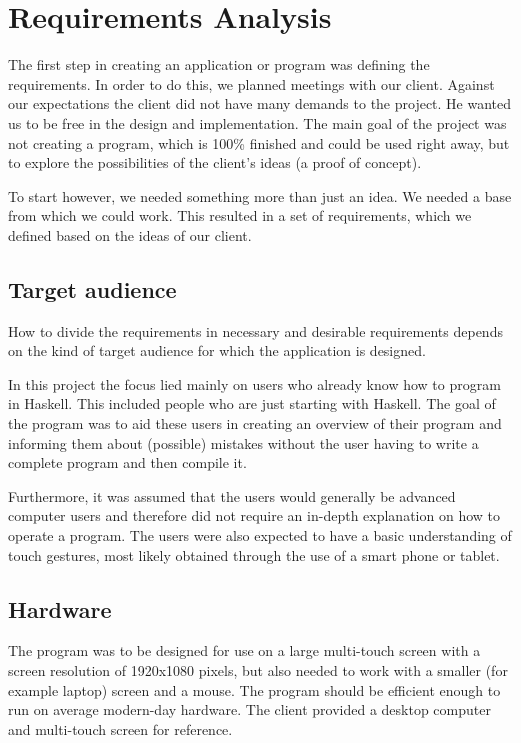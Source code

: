 \chapter{Requirements Analysis}

The first step in creating an application or program was defining the requirements. In order to do this, we planned meetings with our client. Against our expectations the client did not have many demands to the project. He wanted us to be free in the design and implementation. The main goal of the project was not creating a program, which is 100\% finished and could be used right away, but to explore the possibilities of the client's ideas (a proof of concept).

To start however, we needed something more than just an idea. We needed a base from which we could work. This resulted in a set of requirements, which we defined based on the ideas of our client.

\section{Target audience}

How to divide the requirements in necessary and desirable requirements depends on the kind of target audience for which the application is designed.  

In this project the focus lied mainly on users who already know how to program in Haskell. This included people who are just starting with Haskell.
The goal of the program was to aid these users in creating an overview of their program and informing them about (possible) mistakes without the user having to write a complete program and then compile it.

Furthermore, it was assumed that the users would generally be advanced computer users and therefore did not require an in-depth explanation on how to operate a program. The users were also expected to have a basic understanding of touch gestures, most likely obtained through the use of a smart phone or tablet.

\section{Hardware}

The program was to be designed for use on a large multi-touch screen with a screen resolution of 1920x1080 pixels, but also needed to work with a smaller (for example laptop) screen and a mouse. The program should be efficient enough to run on average modern-day hardware. The client provided a desktop computer and multi-touch screen for reference.

